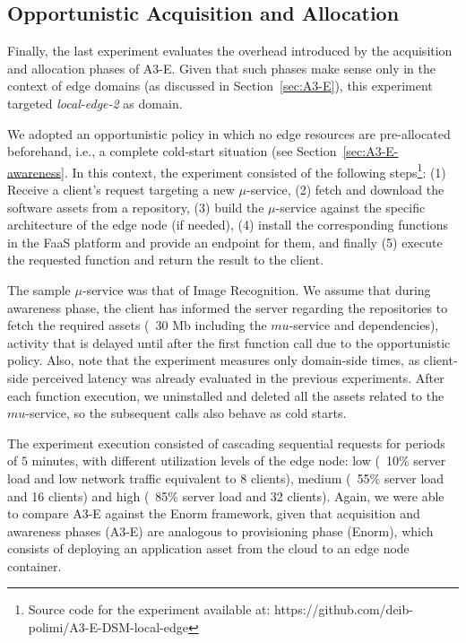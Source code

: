 


\subsection{Opportunistic Acquisition and Allocation}

Finally, the last experiment evaluates the overhead introduced by the acquisition and allocation phases of A3-E. Given that such phases make sense only in the context of edge domains (as discussed in Section~\ref{sec:A3-E}), this experiment targeted \textit{local-edge-2} as domain. 

We adopted an opportunistic policy in which no edge resources are pre-allocated beforehand, i.e., a complete cold-start situation (see Section~\ref{sec:A3-E-awareness}. In this context, the experiment consisted of the following steps\footnote{Source code for the experiment available at: https://github.com/deib-polimi/A3-E-DSM-local-edge}:
(1) Receive a client's request targeting a new $\mu$-service, (2) fetch and download the software assets from a repository, (3) build the $\mu$-service against the specific architecture of the edge node (if needed), (4) install the corresponding functions in the FaaS platform and provide an endpoint for them, and finally (5) execute the requested function and return the result to the client.

The sample $\mu$-service was that of Image Recognition. We assume that during awareness phase, the client has informed the server regarding the repositories to fetch the required assets (~30 Mb including the $mu$-service and dependencies), activity that is delayed until after the first function call due to the opportunistic policy. Also, note that the experiment measures only domain-side times, as client-side perceived latency was already evaluated in the previous experiments. After each function execution, we uninstalled and deleted all the assets related to the $mu$-service, so the subsequent calls also behave as cold starts.

The experiment execution consisted of cascading sequential requests for periods of $5$ minutes, with different utilization levels of the edge node: low (~10\% server load and low network traffic equivalent to 8 clients), medium (~55\% server load and 16 clients) and high (~85\% server load and 32 clients). Again, we were able to compare A3-E against the Enorm framework, given that acquisition and awareness phases (A3-E) are analogous to provisioning phase (Enorm), which consists of deploying an application asset from the cloud to an edge node container. 

